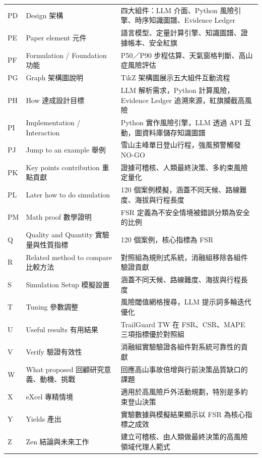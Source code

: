 \documentclass[12pt,a4paper]{article}
\begin{document}
\begin{table}[htbp]
\begin{tabular}{l|l|p{7cm}}
PD & Design 架構 & 四大組件：LLM 介面、Python 風險引擎、時序知識圖譜、Evidence Ledger \\
PE & Paper element 元件 & 語言模型、定量計算引擎、知識圖譜、證據帳本、安全紅旗 \\
PF & Formulation / Foundation 功能 & P50／P90 步程估算、天氣窗格判斷、高山症風險評估 \\
PG & Graph 架構圖說明 & TikZ 架構圖展示五大組件互動流程 \\
PH & How 達成設計目標 & LLM 解析需求，Python 計算風險，Evidence Ledger 追溯來源，紅旗攔截高風險 \\
PI & Implementation / Interaction & Python 實作風險引擎，LLM 透過 API 互動，圖資料庫儲存知識圖譜 \\
PJ & Jump to an example 舉例 & 雪山主峰單日登山行程，強風預警觸發 NO-GO \\
PK & Key points contribution 重點貢獻 & 證據可稽核、人類最終決策、多約束風險定量化 \\
PL & Later how to do simulation & 120 個案例模擬，涵蓋不同天候、路線難度、海拔與行程長度 \\
PM & Math proof 數學證明 & FSR 定義為不安全情境被錯誤分類為安全的比例 \\
Q & Quality and Quantity 實驗量與性質指標 & 120 個案例，核心指標為 FSR \\
R & Related method to compare 比較方法 & 對照組為規則式系統，消融組移除各組件驗證貢獻 \\
S & Simulation Setup 模擬設置 & 涵蓋不同天候、路線難度、海拔與行程長度 \\
T & Tuning 參數調整 & 風險閾值網格搜尋，LLM 提示詞多輪迭代優化 \\
U & Useful results 有用結果 & TrailGuard TW 在 FSR、CSR、MAPE 三項指標優於對照組 \\
V & Verify 驗證有效性 & 消融組實驗驗證各組件對系統可靠性的貢獻 \\
W & What proposed 回顧研究意義、動機、挑戰 & 回應高山事故倍增與行前決策品質缺口的課題 \\
X & eXcel 專精情境 & 適用於高風險戶外活動規劃，特別是多約束登山決策 \\
Y & Yields 產出 & 實驗數據與模擬結果顯示以 FSR 為核心指標之成效 \\
Z & Zen 結論與未來工作 & 建立可稽核、由人類做最終決策的高風險領域代理人範式 \\
\bottomrule
\end{tabular}
\end{table}
\end{document}
